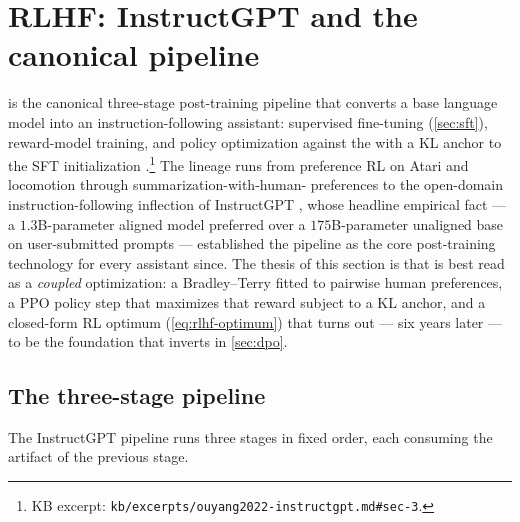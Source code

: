 
\section{RLHF: InstructGPT and the canonical pipeline}
\label{sec:rlhf}

 is the canonical
three-stage post-training pipeline that converts a base language
model into an instruction-following assistant: supervised fine-tuning
(\cref{sec:sft}), reward-model training, and policy optimization
against the  with a KL anchor to the SFT initialization
\citep[\S 3]{ouyang2022-instructgpt}.\footnote{KB excerpt:
\nolinkurl{kb/excerpts/ouyang2022-instructgpt.md#sec-3}.} The lineage
runs from preference RL on Atari and locomotion
\citep{christiano2017-pref-rl} through summarization-with-human-
preferences \citep{stiennon2020-summarize} to the open-domain
instruction-following inflection of InstructGPT
\citep{ouyang2022-instructgpt}, whose headline empirical fact — a
$1.3$B-parameter aligned model preferred over a $175$B-parameter
unaligned base on user-submitted prompts
\citep[\S 4]{ouyang2022-instructgpt} — established the pipeline as
the core post-training technology for every assistant 
since. The thesis of this section is that  is best read as a
\emph{coupled} optimization: a Bradley--Terry  fitted to
pairwise human preferences, a PPO policy step that maximizes that
reward subject to a KL anchor, and a closed-form RL optimum
(\cref{eq:rlhf-optimum}) that turns out — six years later — to be the
foundation that  inverts in \cref{sec:dpo}.

\subsection{The three-stage pipeline}
\label{sec:rlhf-pipeline}

The InstructGPT pipeline \citep[\S 3]{ouyang2022-instructgpt} runs
three stages in fixed order, each consuming the artifact of the
previous stage.

